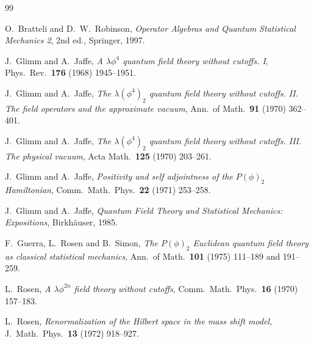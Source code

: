 \documentclass[11pt,a4paper]{article}
\theoremstyle{plain}
\theoremstyle{definition}
\begin{document}
\begin{thebibliography}{99}

 O.~Bratteli and D.~W.~Robinson,
\emph{Operator Algebras and Quantum Statistical Mechanics 2}, 2nd ed., Springer, 1997.

 J.~Glimm and A.~Jaffe,
\emph{A $\lambda\phi^4$ quantum field theory without cutoffs. I},
Phys.\ Rev.\ \textbf{176} (1968) 1945--1951.

 J.~Glimm and A.~Jaffe,
\emph{The $\lambda(\phi^4)_2$ quantum field theory without cutoffs. II. The field operators and
the approximate vacuum}, Ann.\ of Math.\ \textbf{91} (1970) 362--401.

 J.~Glimm and A.~Jaffe,
\emph{The $\lambda(\phi^4)_2$ quantum field theory without cutoffs. III. The physical vacuum},
Acta Math.\ \textbf{125} (1970) 203--261.

 J.~Glimm and A.~Jaffe,
\emph{Positivity and self adjointness of the $P(\phi)_2$ Hamiltonian},
Comm.\ Math.\ Phys.\ \textbf{22} (1971) 253--258.

 J.~Glimm and A.~Jaffe,
\emph{Quantum Field Theory and Statistical Mechanics: Expositions}, Birkh\"auser, 1985.

 F.~Guerra, L.~Rosen and B.~Simon,
\emph{The $P(\phi)_2$ Euclidean quantum field theory as classical statistical mechanics},
Ann.\ of Math.\ \textbf{101} (1975) 111--189 and 191--259.

 L.~Rosen,
\emph{A $\lambda\phi^{2n}$ field theory without cutoffs},
Comm.\ Math.\ Phys.\ \textbf{16} (1970) 157--183.

 L.~Rosen,
\emph{Renormalization of the Hilbert space in the mass shift model},
J.\ Math.\ Phys.\ \textbf{13} (1972) 918--927.

\end{thebibliography}
\end{document}
